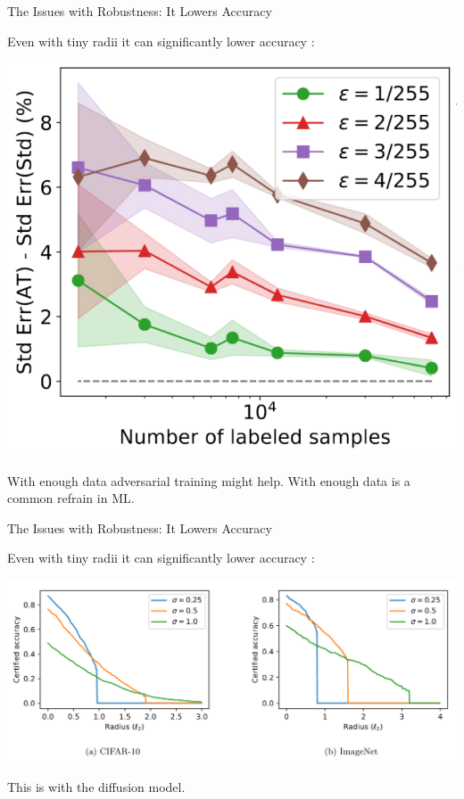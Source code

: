 \documentclass{beamer}
\begin{document}
\begin{frame}{The Issues with Robustness: It Lowers Accuracy}
    \begin{center}
        Even with tiny radii it can significantly lower accuracy \cite{robustness_tradeoff_infinite_data}:

        \includegraphics[scale=0.22]{accuracy_of_robust_nn.png}

        With enough data adversarial training might help. With enough data is a common refrain in ML. 
    \end{center}
\end{frame}

\begin{frame}{The Issues with Robustness: It Lowers Accuracy}
    \begin{center}
        Even with tiny radii it can significantly lower accuracy \cite{florian_robustness}:

        \includegraphics[scale=0.3]{certified_robustness.png}

        This is with the diffusion model.
    \end{center}
\end{frame}
\end{document}
